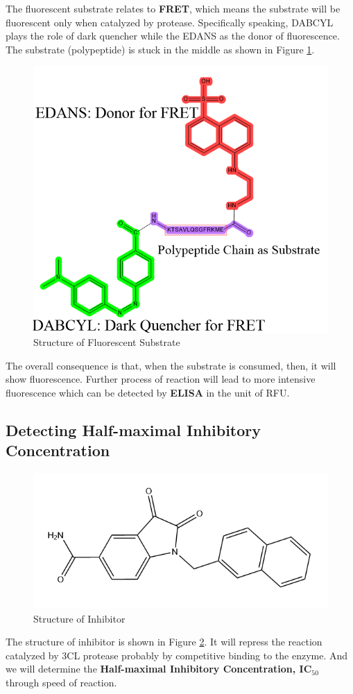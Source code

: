 \documentclass{report}
\begin{document}
The fluorescent substrate relates to \textbf{FRET}, which means the substrate will be fluorescent only when catalyzed by protease.
Specifically speaking, DABCYL plays the role of dark quencher while the EDANS as the donor of fluorescence.
The substrate (polypeptide) is stuck in the middle as shown in Figure \ref{Structure of Fluorescent Substrate}.
\begin{figure}
    \centering
    \includegraphics[width=0.5\linewidth]{../Figures/fluorescent substrate.png}
    \caption{Structure of Fluorescent Substrate}
    \label{Structure of Fluorescent Substrate}
\end{figure}

The overall consequence is that, when the substrate is consumed, then, it will show fluorescence.
Further process of reaction will lead to more intensive fluorescence which can be detected by \textbf{ELISA} in the unit of RFU.

\subsection{Detecting Half-maximal Inhibitory Concentration}
\begin{figure}
    \centering
    \includegraphics[width=0.5\linewidth]{../Figures/inhibitor structure.png}
    \caption{Structure of Inhibitor}
    \label{Structure of Inhibitor}
\end{figure}
The structure of inhibitor is shown in Figure \ref{Structure of Inhibitor}.
It will repress the reaction catalyzed by 3CL protease probably by competitive binding to the enzyme.
And we will determine the \textbf{Half-maximal Inhibitory Concentration, IC$_{50}$} through speed of reaction.
\end{document}
